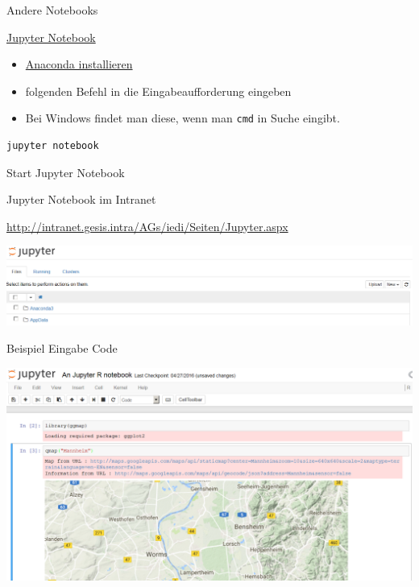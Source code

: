 \documentclass[ignorenonframetext,]{beamer}
\providecommand{\tightlist}{%
\setlength{\itemsep}{0pt}\setlength{\parskip}{0pt}}
\begin{document}
\begin{frame}[fragile]{Andere Notebooks}

\begin{block}{\href{http://jupyter.readthedocs.io/en/latest/install.html}{Jupyter
Notebook}}

\begin{itemize}
\tightlist
\item
  \href{https://docs.continuum.io/anaconda/install}{Anaconda
  installieren}
\item
  folgenden Befehl in die Eingabeaufforderung eingeben
\item
  Bei Windows findet man diese, wenn man \texttt{cmd} in Suche eingibt.
\end{itemize}

\begin{verbatim}
jupyter notebook
\end{verbatim}

\end{block}

\begin{block}{Start Jupyter Notebook}

\begin{block}{Jupyter Notebook im Intranet}

\url{http://intranet.gesis.intra/AGs/iedi/Seiten/Jupyter.aspx}

\includegraphics{./tex2pdf.9796/8aa3665d272439dafa950831569516799b69fe48.png}

\end{block}

\end{block}

\begin{block}{Beispiel Eingabe Code}

\includegraphics{./tex2pdf.9796/9682add0bb5b6be6c5b163a305f44befb1c85ce8.png}

\end{block}

\end{frame}
\end{document}
